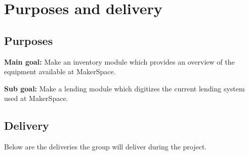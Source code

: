 \section{Purposes and delivery}
\subsection{Purposes}


\textbf{Main goal:} Make an inventory module which provides an overview of the equipment available at MakerSpace.

\textbf{Sub goal:} Make a lending module which digitizes the current lending system used at MakerSpace.





\subsection{Delivery}

Below are the deliveries the group will deliver during the project.

